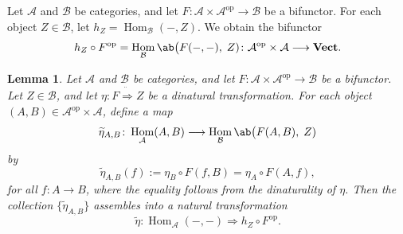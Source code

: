 \documentclass[12pt, english]{article}
\numberwithin{equation}{section}
\DeclareMathOperator{\Hom}{Hom}
\DeclareMathOperator{\opp}{op}
\theoremstyle{plain}
\newtheorem{lemma}{Lemma}[section]
\theoremstyle{definition}
\theoremstyle{remark}
\begin{document}
	
	
	Let $\mathcal{A}$ and $\mathcal{B}$ be categories, and let $F\colon\mathcal{A} \times\mathcal{A}^{\opp} \longrightarrow \mathcal{B} $ be a bifunctor.
	For each object $Z \in \mathcal{B}$, let $h_Z=\Hom_{\mathcal{B}}(-,Z)$. We obtain the bifunctor
	\[
	h_Z\circ F^{\opp} =  \Hom_{\mathcal{B}} \ab\big(F(-, -), \; Z) \colon \mathcal{A}^{\opp}\times\mathcal{A} \longrightarrow \mathbf{Vect}.
	\]
	
	
	\begin{lemma} \label{lem:dinatural-to-natural}
		Let $\mathcal{A}$ and $\mathcal{B}$ be categories, and let $F\colon\mathcal{A} \times\mathcal{A}^{\opp} \longrightarrow \mathcal{B} $ be a bifunctor.
		Let $Z \in \mathcal{B}$, and let $\eta \colon F \ddot{ \Rightarrow } Z$ be a dinatural transformation.
		For each object $ (A, B) \in \mathcal{A}^{\opp} \times\mathcal{A} $,  define a map
		\[
		\widetilde{\eta}_{A, B} \colon \Hom_{\mathcal{A}}(A, B)
		\longrightarrow \Hom_{\mathcal{B}} \ab\big(F(A, B), \; Z)
		\]
		by
		\begin{equation} \label{eq:dinatural-to-natural}
			\widetilde{\eta}_{A, B}(f) := \eta_B \circ F(f, B) = \eta_A \circ F(A, f),
		\end{equation}
		for all $f \colon A \to B$,
		where the equality follows from the dinaturality of $\eta$.
		Then the collection $\{\widetilde{\eta}_{A, B}\}$ assembles into a natural transformation
		\[
		\widetilde{\eta} \colon \Hom_{\mathcal{A}}(-, -) \Rightarrow h_Z\circ F^{\opp}.
		\]
	\end{lemma}
	
\end{document}
